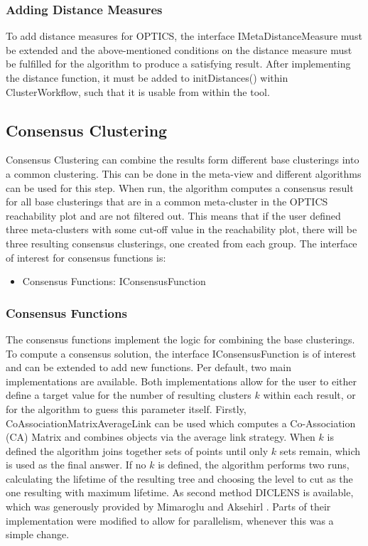 \documentclass[
	a4paper,
	english,
	twoside,
	openright,               
	11pt                            
	]{report}
\begin{document}
\subsubsection*{Adding Distance Measures}
To add distance measures for OPTICS, the interface IMetaDistanceMeasure must be extended and the above-mentioned conditions on the distance measure must be fulfilled for the algorithm to produce a satisfying result. After implementing the distance function, it must be added to initDistances() within ClusterWorkflow, such that it is usable from within the tool.

\subsection{Consensus Clustering}
Consensus Clustering can combine the results form different base clusterings into a common clustering. This can be done in the meta-view and different algorithms can be used for this step. When run, the algorithm computes a consensus result for all base clusterings that are in a common meta-cluster in the OPTICS reachability plot and are not filtered out. This means that if the user defined three meta-clusters with some cut-off value in the reachability plot, there will be three resulting consensus clusterings, one created from each group. The interface of interest for consensus functions is:

\begin{itemize}
  \item Consensus Functions: IConsensusFunction
\end{itemize}

\subsubsection{Consensus Functions}
The consensus functions implement the logic for combining the base clusterings. To compute a consensus solution, the interface IConsensusFunction is of interest and can be extended to add new functions. Per default, two main implementations are available. Both implementations allow for the user to either define a target value for the number of resulting clusters $k$ within each result, or for the algorithm to guess this parameter itself. Firstly, CoAssociationMatrixAverageLink can be used which computes a Co-Association (CA) Matrix and combines objects via the average link strategy. When $k$ is defined the algorithm joins together sets of points until only $k$ sets remain, which is used as the final answer. If no $k$ is defined, the algorithm performs two runs, calculating the lifetime \cite{lifetime} of the resulting tree and choosing the level to cut as the one resulting with maximum lifetime. As second method DICLENS is available, which was generously provided by Mimaroglu and Aksehirl \cite{DICLENS}. Parts of their implementation were modified to allow for parallelism, whenever this was a simple change.
\end{document}
